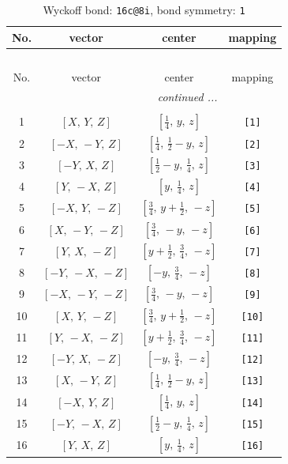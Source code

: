 \documentclass[fleqn,8pt]{jsarticle}
\begin{document}
\begin{longtable}{cccc}
\caption{Wyckoff bond: {\tt 16c@8i}, bond symmetry: {\tt 1}}
 \\
 \hline \hline
No. & vector & center & mapping \\ \hline \endfirsthead

\multicolumn{3}{l}{\tablename\ \thetable{}} \\
 \hline \hline
No. & vector & center & mapping \\ \hline \endhead

 \hline \hline
\multicolumn{3}{r}{\footnotesize\it continued ...} \\ \endfoot

 \hline \hline
\multicolumn{3}{r}{} \\ \endlastfoot

1 & $\left[ X,\, Y,\, Z \right]$ & $\left[ \frac{1}{4},\, y,\, z \right]$ & {\tt [1]} \\ \hline
2 & $\left[ - X,\, - Y,\, Z \right]$ & $\left[ \frac{1}{4},\, \frac{1}{2} - y,\, z \right]$ & {\tt [2]} \\ \hline
3 & $\left[ - Y,\, X,\, Z \right]$ & $\left[ \frac{1}{2} - y,\, \frac{1}{4},\, z \right]$ & {\tt [3]} \\ \hline
4 & $\left[ Y,\, - X,\, Z \right]$ & $\left[ y,\, \frac{1}{4},\, z \right]$ & {\tt [4]} \\ \hline
5 & $\left[ - X,\, Y,\, - Z \right]$ & $\left[ \frac{3}{4},\, y + \frac{1}{2},\, - z \right]$ & {\tt [5]} \\ \hline
6 & $\left[ X,\, - Y,\, - Z \right]$ & $\left[ \frac{3}{4},\, - y,\, - z \right]$ & {\tt [6]} \\ \hline
7 & $\left[ Y,\, X,\, - Z \right]$ & $\left[ y + \frac{1}{2},\, \frac{3}{4},\, - z \right]$ & {\tt [7]} \\ \hline
8 & $\left[ - Y,\, - X,\, - Z \right]$ & $\left[ - y,\, \frac{3}{4},\, - z \right]$ & {\tt [8]} \\ \hline
9 & $\left[ - X,\, - Y,\, - Z \right]$ & $\left[ \frac{3}{4},\, - y,\, - z \right]$ & {\tt [9]} \\ \hline
10 & $\left[ X,\, Y,\, - Z \right]$ & $\left[ \frac{3}{4},\, y + \frac{1}{2},\, - z \right]$ & {\tt [10]} \\ \hline
11 & $\left[ Y,\, - X,\, - Z \right]$ & $\left[ y + \frac{1}{2},\, \frac{3}{4},\, - z \right]$ & {\tt [11]} \\ \hline
12 & $\left[ - Y,\, X,\, - Z \right]$ & $\left[ - y,\, \frac{3}{4},\, - z \right]$ & {\tt [12]} \\ \hline
13 & $\left[ X,\, - Y,\, Z \right]$ & $\left[ \frac{1}{4},\, \frac{1}{2} - y,\, z \right]$ & {\tt [13]} \\ \hline
14 & $\left[ - X,\, Y,\, Z \right]$ & $\left[ \frac{1}{4},\, y,\, z \right]$ & {\tt [14]} \\ \hline
15 & $\left[ - Y,\, - X,\, Z \right]$ & $\left[ \frac{1}{2} - y,\, \frac{1}{4},\, z \right]$ & {\tt [15]} \\ \hline
16 & $\left[ Y,\, X,\, Z \right]$ & $\left[ y,\, \frac{1}{4},\, z \right]$ & {\tt [16]} \\
\end{longtable}
\end{document}

